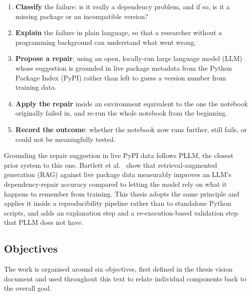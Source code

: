 \begin{enumerate}
  \item \textbf{Classify} the failure: is it really a dependency problem, and
        if so, is it a missing package or an incompatible version?
  \item \textbf{Explain} the failure in plain language, so that a researcher
        without a programming background can understand what went wrong.
  \item \textbf{Propose a repair}, using an open, locally-run large language
        model (LLM) whose suggestion is grounded in live package metadata
        from the Python Package Index (PyPI) rather than left to guess a
        version number from training data.
  \item \textbf{Apply the repair} inside an environment equivalent to the one
        the notebook originally failed in, and re-run the whole notebook from
        the beginning.
  \item \textbf{Record the outcome}: whether the notebook now runs further,
        still fails, or could not be meaningfully tested.
  \end{enumerate}

Grounding the repair suggestion in live PyPI data follows PLLM, the closest
prior system to this one. Bartlett et
al.~\cite{bartlett2025pllm} show that retrieval-augmented generation (RAG)
against live package data measurably improves an LLM's dependency-repair
accuracy compared to letting the model rely on what it happens to remember
from training. This thesis adopts the same principle and applies it inside a
reproducibility pipeline rather than to standalone Python scripts, and adds
an explanation step and a re-execution-based validation step that PLLM does
not have.

\subsection{Objectives}
\label{sec:intro-objectives}

The work is organised around six objectives, first defined in the thesis
vision document and used throughout this text to relate individual
components back to the overall goal.

